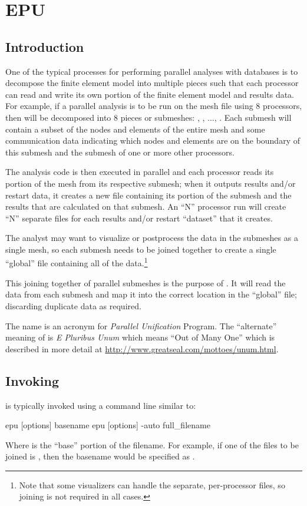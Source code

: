 \chapter{EPU}\label{ch:epu}
\section{Introduction}
One of the typical processes for performing parallel analyses with
\exo{} databases is to decompose the finite element model into
multiple pieces such that each processor can read and write its own
portion of the finite element model and results data.  For example, if
a parallel analysis is to be run on the mesh file  using
8 processors, then  will be decomposed into 8 pieces or submeshes:
, , $\ldots$,
. Each submesh will contain a subset of the nodes and
elements of the entire mesh and some communication data indicating
which nodes and elements are on the boundary of this submesh and the
submesh of one or more other processors.

The analysis code is then executed in parallel and each processor
reads its portion of the mesh from its respective submesh; when it
outputs results and/or restart data, it creates a new file containing
its portion of the submesh and the results that are calculated on that
submesh.  An ``N'' processor run will create ``N'' separate files for
each results and/or restart ``dataset'' that it creates.

The analyst may want to visualize or postprocess the data in the
submeshes as a single mesh, so each submesh needs to be joined
together to create a single ``global'' file containing all of the
data.\footnote{Note that some visualizers can handle the separate,
per-processor files, so joining is not required in all cases.}

This joining together of parallel submeshes is the purpose of \epu{}.
It will read the data from each submesh and map it into the correct
location in the ``global'' file; discarding duplicate data as
required.

The name \epu{} is an acronym for {\em \exo{} Parallel Unification}
Program.  The ``alternate'' meaning of \epu{} is {\em E Pluribus Unum} which means
``Out of Many One'' which is described in more detail at
\url{http://www.greatseal.com/mottoes/unum.html}.

\section{Invoking \epu}
\epu{} is typically invoked using a command line similar to:
\begin{syntax}
epu [options] basename
epu [options] -auto full_filename
\end{syntax}
Where  is the ``base'' portion of the filename.  For
example, if one of the files to be joined is ,
then the basename would be specified as .

